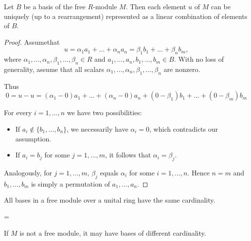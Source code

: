 \begin{proposition}\label{def:module_basis_decomposition}
  Let \( B \) be a basis of the free \( R \)-module \( M \). Then each element \( u \) of \( M \) can be uniquely (up to a rearrangement) represented as a linear combination of elements of \( B \).
\end{proposition}
\begin{proof}
  Assume\LEM that
  \begin{equation*}
    u = \alpha_1 a_1 + \ldots + \alpha_n a_n = \beta_1 b_1 + \ldots + \beta_n b_m,
  \end{equation*}
  where \( \alpha_1, \ldots, \alpha_n, \beta_1, \ldots, \beta_n \in R \) and \( a_1, \ldots, a_n, b_1, \ldots, b_m \in B \). With no loss of generality, assume that all scalars \( \alpha_1, \ldots, \alpha_n, \beta_1, \ldots, \beta_n \) are nonzero.

  Thus
  \begin{equation*}
    0 = u - u = (\alpha_1 - 0) a_1 + \ldots + (\alpha_n - 0) a_n + (0 - \beta_1) b_1 + \ldots + (0 - \beta_m) b_m
  \end{equation*}

  For every \( i = 1, \ldots, n \) we have two possibilities:
  \begin{itemize}
    \item If \( a_i \not\in \{ b_1, \ldots, b_n \} \), we necessarily have \( \alpha_i = 0 \), which contradicts our assumption.
    \item If \( a_i = b_j \) for some \( j = 1, \ldots, m \), it follows that \( \alpha_i = \beta_j \).
  \end{itemize}

  Analogously, for \( j = 1, \ldots, m \), \( \beta_j \) equals \( \alpha_i \) for some \( i = 1, \ldots, n \). Hence \( n = m \) and \( b_1, \ldots, b_m \) is simply a permutation of \( a_1, \ldots, a_n \).
\end{proof}

\begin{proposition}\label{thm:free_module_basis_cardinality}\cite{ProofWiki:bases_of_free_module_have_same_cardinality}
  All bases in a free module over a unital ring have the same cardinality.
\end{proposition}
=
\begin{example}\label{ex:free_module_with_non_equinumerous_bases}
  If \( M \) is not a free module, it may have bases of different cardinality.
\end{example}

